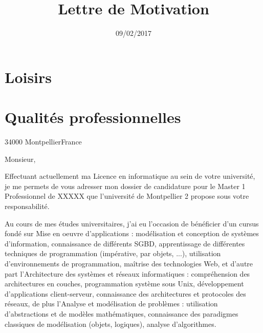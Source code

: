 \documentclass[11pt,a4paper,sans]{moderncv}
\begin{document}
\section{Loisirs}


\section{Qualités professionnelles}





\clearpage


\title{Lettre de Motivation}                              
\address{192,Rue de la chenaie cité universitaire vert bois}{34000 Montpellier}{France}


\date{09/02/2017}
\opening{}
\closing{}
\makelettertitle
{}


 Monsieur,

Effectuant actuellement ma Licence en informatique au sein de votre université, je me permets de vous adresser mon dossier de candidature pour le Master 1 Professionnel de XXXXX que l’université de Montpellier 2 propose sous votre responsabilité.

Au cours de mes études universitaires, j’ai eu l’occasion de bénéficier d’un cursus fondé sur Mise en oeuvre d'applications : modélisation et conception de systèmes d'information, connaissance de différents SGBD, apprentissage de différentes techniques de programmation (impérative, par objets, ...), utilisation d'environnements de programmation, maîtrise des technologies Web, et d’autre part l'Architecture des systèmes et réseaux informatiques : compréhension des architectures en couches, programmation système sous Unix, développement d'applications client-serveur, connaissance des architectures et protocoles des réseaux, de plus l'Analyse et modélisation de problèmes : utilisation d'abstractions et de modèles mathématiques, connaissance des paradigmes classiques de modélisation (objets, logiques), analyse d'algorithmes.
\end{document}

